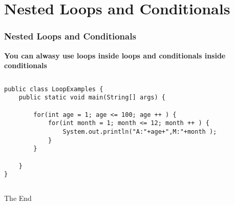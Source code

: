 \documentclass{beamer}
\begin{document}
\section{Nested Loops and Conditionals}

\begin{frame}[fragile]
\frametitle{Nested Loops and Conditionals}
\textbf{You can alwasy use loops inside loops and conditionals inside conditionals}\\
\begin{columns}[T]
\begin{column}{\textwidth}
\begin{lstlisting}
public class LoopExamples {
    public static void main(String[] args) {

        for(int age = 1; age <= 100; age ++ ) {
            for(int month = 1; month <= 12; month ++ ) {
                System.out.println("A:"+age+",M:"+month );
            }
        }

    }
}
\end{lstlisting}
\end{column}
\end{columns}
\end{frame}



\begin{frame}
\Huge{\centerline{The End}}
\end{frame}

\end{document}
